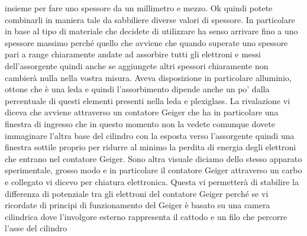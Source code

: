{insieme per fare uno spessore da un millimetro e mezzo. Ok quindi potete combinarli in maniera tale da sabbiliere diverse valori di spessore. In particolare in base al tipo di materiale che decidete di utilizzare ha senso arrivare fino a uno spessore massimo perché quello che avviene che quando superate uno spessore pari a range chiaramente andate ad assorbire tutti gli elettroni e messi dell'assorgente quindi anche se aggiungete altri spessori chiaramente non cambierà nulla nella vostra misura. Aveva disposizione in particolare alluminio, ottone che è una leda e quindi l'assorbimento dipende anche un po' dalla percentuale di questi elementi presenti nella leda e plexiglass. La rivalazione vi diceva che avviene attraverso un contatore Geiger che ha in particolare una finestra di ingresso che in questo momento non la vedete comunque dovete immaginare l'altra base del cilindro con la esposta verso l'assorgente quindi una finestra sottile proprio per ridurre al minimo la perdita di energia degli elettroni che entrano nel contatore Geiger. Sono altra visuale diciamo dello stesso apparato sperimentale, grosso modo e in particolare il contatore Geiger attraverso un carbo e collegato vi dicevo per chiatura elettronica. Questa vi permetterà di stabilire la differenza di potenziale tra gli elettroni del contatore Geiger perché se vi ricordate di principi di funzionamento del Geiger è basato su una camera cilindrica dove l'involgore esterno rappresenta il cattodo e un filo che percorre l'asse del cilindro 

}

